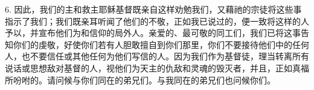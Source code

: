 6. 因此，我们的主和救主耶稣基督既亲自这样劝勉我们，又藉祂的宗徒将这些事指示了我们；我们既亲耳听闻了他们的不敬，正如我已说过的，便一致将这样的人予以，并宣布他们为和信仰的局外人。亲爱的、最可敬的同工们，我们已将这事告知你们的虔敬，好使你们若有人胆敢擅自到你们那里，你们不要接待他们中的任何人，也不要信任或其他任何为他们写信的人。因为我们作为基督徒，理当转离所有说话或思想敌对基督的人，视他们为天主的仇敌和灵魂的毁灭者，并且，正如真福所吩咐的。请问候与你们同在的弟兄们。与我同在的弟兄们也问候你们。\newline{}\par

\par

